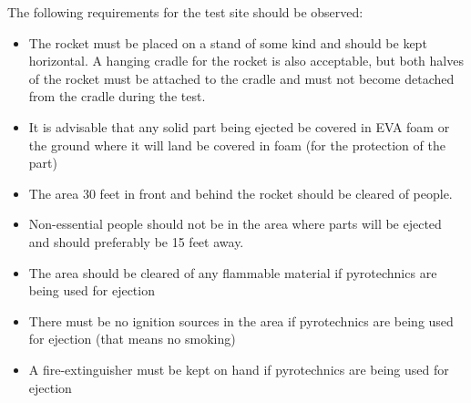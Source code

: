 The following requirements for the test site should be observed:
\begin{itemize}
\item The rocket must be placed on a stand of some kind and should be kept horizontal. A hanging cradle for the rocket is also acceptable, but both halves of the rocket must be attached to the cradle and must not become detached from the cradle during the test.
\item It is advisable that any solid part being ejected be covered in EVA foam or the ground where it will land be covered in foam (for the protection of the part)
\item The area 30 feet in front and behind the rocket should be cleared of people.
\item Non-essential people should not be in the area where parts will be ejected and should preferably be 15 feet away.
\item The area should be cleared of any flammable material if pyrotechnics are being used for ejection
\item There must be no ignition sources in the area if pyrotechnics are being used for ejection (that means no smoking)
\item A fire-extinguisher must be kept on hand if pyrotechnics are being used for ejection
\end{itemize}
